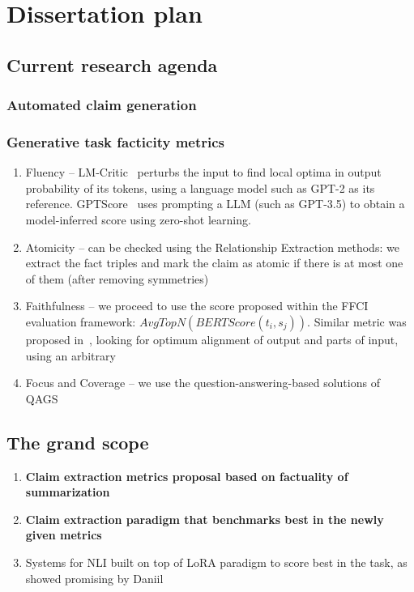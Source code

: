
\chapter{Dissertation plan}
\label{chap:plan}

\section{Current research agenda}
\subsection{Automated claim generation}
\todo{}
\subsection{Generative task facticity metrics}
\begin{enumerate}
    \item {\techbf Fluency} -- \textsf{LM-Critic}~\cite{yasunaga-etal-2021-lm} perturbs the input to find local optima in output probability of its tokens, using a language model such as GPT-2 as its reference. \textsf{GPTScore}~\cite{fu2023gptscore} uses prompting a LLM (such as GPT-3.5) to obtain a model-inferred score using zero-shot learning.
    \item {\techbf Atomicity} -- can be checked using the Relationship Extraction methods: we extract the fact triples and mark the claim as atomic if there is at most one of them (after removing symmetries)
    \item {\techbf Faithfulness} -- we proceed to use the score proposed within the FFCI evaluation framework: $AvgTopN(BERTScore(t_i,s_j))$. Similar metric was proposed in~\cite{zha2023alignscore}, looking for optimum alignment of output and parts of input, using an arbitrary 
    \item {\techbf Focus and Coverage} -- we use the question-answering-based solutions of QAGS~\cite{wang-etal-2020-asking}
\end{enumerate}

\section{The grand scope}
\begin{enumerate}
    \item \textbf{Claim extraction metrics proposal based on factuality of summarization}
    \item \textbf{Claim extraction paradigm that benchmarks best in the newly given metrics}
    \item Systems for NLI built on top of LoRA paradigm to score best in the task, as showed promising by Daniil
    
\end{enumerate}